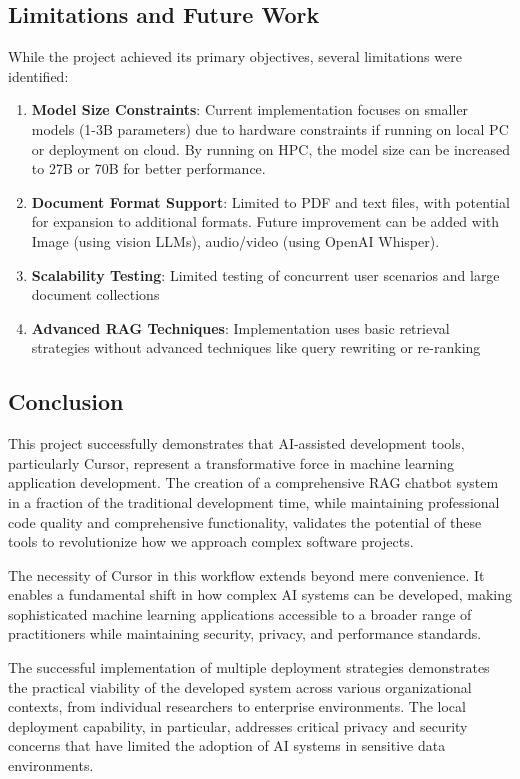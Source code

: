 \documentclass[12pt,letterpaper]{article}
\begin{document}
\subsection{Limitations and Future Work}

While the project achieved its primary objectives, several limitations were identified:

\begin{enumerate}
    \item \textbf{Model Size Constraints}: Current implementation focuses on smaller models (1-3B parameters) due to hardware constraints if running on local PC or deployment on cloud. By running on HPC, the model size can be increased to 27B or 70B for better performance.
    \item \textbf{Document Format Support}: Limited to PDF and text files, with potential for expansion to additional formats. Future improvement can be added with Image (using vision LLMs), audio/video (using OpenAI Whisper).
    \item \textbf{Scalability Testing}: Limited testing of concurrent user scenarios and large document collections
    \item \textbf{Advanced RAG Techniques}: Implementation uses basic retrieval strategies without advanced techniques like query rewriting or re-ranking
\end{enumerate}

\subsection{Conclusion}

This project successfully demonstrates that AI-assisted development tools, particularly Cursor, represent a transformative force in machine learning application development. The creation of a comprehensive RAG chatbot system in a fraction of the traditional development time, while maintaining professional code quality and comprehensive functionality, validates the potential of these tools to revolutionize how we approach complex software projects.

The necessity of Cursor in this workflow extends beyond mere convenience. It enables a fundamental shift in how complex AI systems can be developed, making sophisticated machine learning applications accessible to a broader range of practitioners while maintaining security, privacy, and performance standards.

The successful implementation of multiple deployment strategies demonstrates the practical viability of the developed system across various organizational contexts, from individual researchers to enterprise environments. The local deployment capability, in particular, addresses critical privacy and security concerns that have limited the adoption of AI systems in sensitive data environments.
\end{document}
